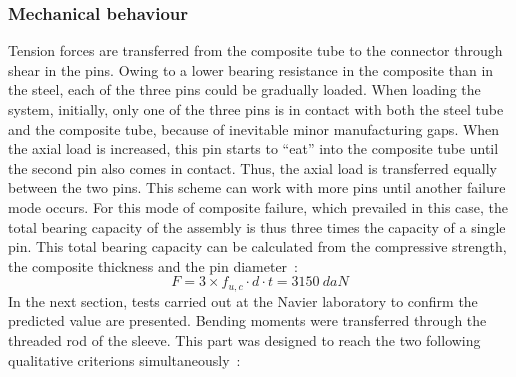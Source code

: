 \subsubsection{Mechanical behaviour}

Tension forces are transferred from the composite tube to the connector through shear in the pins. Owing to a lower bearing resistance in the composite than in the steel, each of the three pins could be gradually loaded. When loading the system, initially, only one of the three pins is in contact with both the steel tube and the composite tube, because of inevitable minor manufacturing gaps. When the axial load is increased, this pin starts to “eat” into the composite tube until the second pin also comes in contact. Thus, the axial load is transferred equally between the two pins. This scheme can work with more pins until another failure mode occurs.
For this mode of composite failure, which prevailed in this case, the total bearing capacity of the assembly is thus three times the capacity of a single pin. This total bearing capacity can be calculated from the compressive strength, the composite thickness and the pin diameter~:
\begin{equation}
	F = 3 \times f_{u,c}\cdot d \cdot t = \SI{3150}{daN}
\end{equation}
In the next section, tests carried out at the Navier laboratory to confirm the predicted value are presented.
Bending moments were transferred through the threaded rod of the sleeve. This part was designed to reach the two following qualitative criterions simultaneously~:

